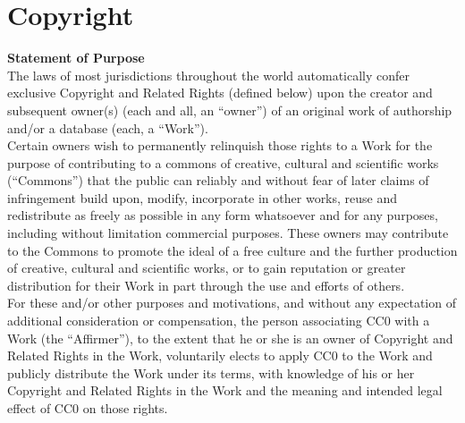 
\chapter*{Copyright}


\noindent \textbf{Statement of Purpose} \\

\noindent The laws of most jurisdictions throughout the world automatically confer
exclusive Copyright and Related Rights (defined below) upon the creator and
subsequent owner(s) (each and all, an ``owner'') of an original work of
authorship and/or a database (each, a ``Work''). \\

Certain owners wish to permanently relinquish those rights to a Work for the
purpose of contributing to a commons of creative, cultural and scientific
works (``Commons'') that the public can reliably and without fear of later
claims of infringement build upon, modify, incorporate in other works, reuse
and redistribute as freely as possible in any form whatsoever and for any
purposes, including without limitation commercial purposes. These owners may
contribute to the Commons to promote the ideal of a free culture and the
further production of creative, cultural and scientific works, or to gain
reputation or greater distribution for their Work in part through the use and
efforts of others. \\

For these and/or other purposes and motivations, and without any expectation
of additional consideration or compensation, the person associating CC0 with a
Work (the ``Affirmer''), to the extent that he or she is an owner of Copyright
and Related Rights in the Work, voluntarily elects to apply CC0 to the Work
and publicly distribute the Work under its terms, with knowledge of his or her
Copyright and Related Rights in the Work and the meaning and intended legal
effect of CC0 on those rights. \\

